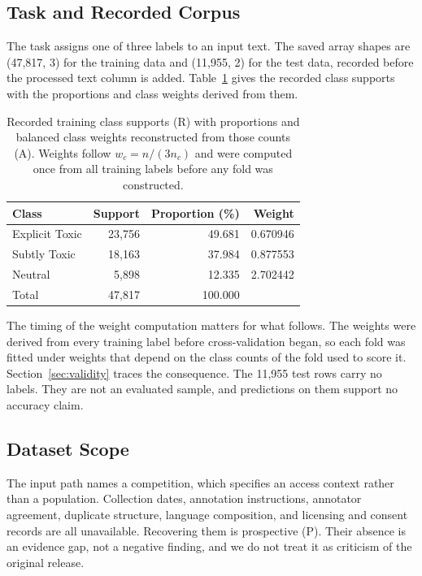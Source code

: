 \documentclass[runningheads]{llncs}
\begin{document}
\subsection{Task and Recorded Corpus}

The task assigns one of three labels to an input text. The saved array shapes are (47,817, 3) for the training data and (11,955, 2) for the test data, recorded before the processed text column is added. Table~\ref{tab:supports} gives the recorded class supports with the proportions and class weights derived from them.

\begin{table}[t]
\centering
\caption{Recorded training class supports (R) with proportions and balanced class weights reconstructed from those counts (A). Weights follow $w_c = n/(3n_c)$ and were computed once from all training labels before any fold was constructed.}
\label{tab:supports}
\begin{tabular}{lrrr}
\toprule
Class & Support & Proportion (\%) & Weight \\
\midrule
Explicit Toxic & 23,756 & 49.681 & 0.670946 \\
Subtly Toxic & 18,163 & 37.984 & 0.877553 \\
Neutral & 5,898 & 12.335 & 2.702442 \\
\midrule
Total & 47,817 & 100.000 & \\
\bottomrule
\end{tabular}
\end{table}

The timing of the weight computation matters for what follows. The weights were derived from every training label before cross-validation began, so each fold was fitted under weights that depend on the class counts of the fold used to score it. Section~\ref{sec:validity} traces the consequence. The 11,955 test rows carry no labels. They are not an evaluated sample, and predictions on them support no accuracy claim.

\subsection{Dataset Scope}

The input path names a competition, which specifies an access context rather than a population. Collection dates, annotation instructions, annotator agreement, duplicate structure, language composition, and licensing and consent records are all unavailable. Recovering them is prospective (P). Their absence is an evidence gap, not a negative finding, and we do not treat it as criticism of the original release.
\end{document}
